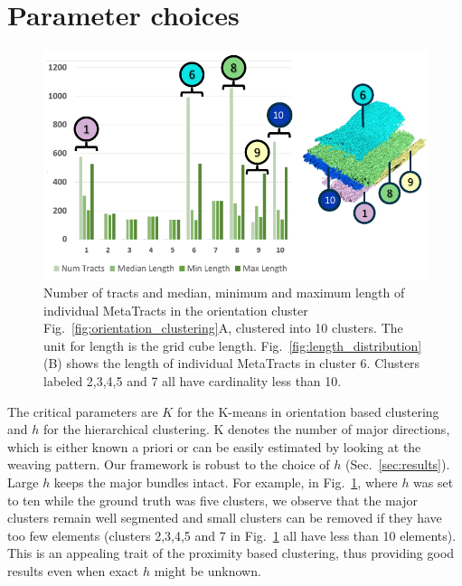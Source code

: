 \section{Parameter choices}
\label{sec:param_choices}
\begin{figure}[tb]
\centering
	\includegraphics[width=\linewidth,  trim = 0mm 260mm 0mm 15mm, clip]{images_pvis/figure9}
	\caption{Number of tracts and median, minimum and maximum length of individual MetaTracts in the orientation cluster Fig.~\ref{fig:orientation_clustering}A, clustered into 10 clusters. The unit for length is the grid cube length. Fig.~\ref{fig:length_distribution}(B) shows the length of individual MetaTracts in cluster 6. Clusters labeled 2,3,4,5 and 7 all have cardinality less than 10. }
	\label{fig:len_dist_crop16}
\end{figure}
The critical parameters are $K$ for the K-means in orientation based clustering and $h$ for the hierarchical clustering. K denotes the number of major directions, which is either known a priori or can be easily estimated by looking at the weaving pattern. 
Our framework is robust to the choice of $h$ (Sec.~\ref{sec:results}). Large $h$ keeps the major bundles intact. For example, in  Fig.~\ref{fig:len_dist_crop16}, where $h$ was set to ten while the ground truth was five clusters, we observe that the major clusters remain well segmented and small clusters can be removed if they have too few elements (clusters 2,3,4,5 and 7 in Fig.~\ref{fig:len_dist_crop16} all have less than 10 elements). This is an appealing trait of the proximity based clustering, thus providing good results even when exact $h$ might be unknown.
